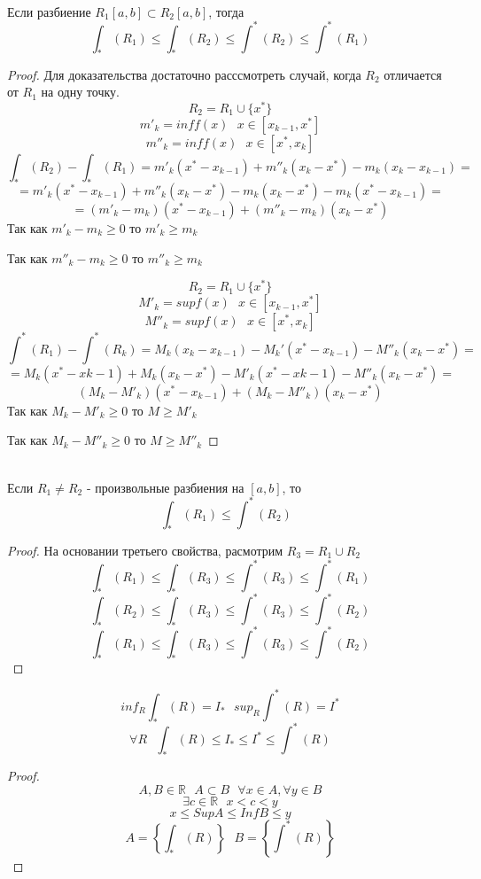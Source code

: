 \\
Если разбиение $R_1 [a,b] \subset R_2 [a,b]$, тогда
\[\int_* (R_1) \le \int_* (R_2) \le \int^* (R_2) \le \int^* (R_1)\]

\begin{proof}
  Для доказательства достаточно расссмотреть случай, когда $R_2$ отличается от
  $R_1$ на одну точку.
  \[R_2 = R_1 \cup \{x^*\}\]
  \[m'_k = inf f(x) ~~~ x \in [x_{k - 1}, x^*]\]
  \[m''_k = inf f(x) ~~~ x \in [x^*, x_k]\]
  \[
     \int_* (R_2) - \int_* (R_1) = m'_k (x^* - x_{k-1}) + m''_k (x_k - x^*) -
     m_k (x_k - x_{k - 1}) =
  \]
  \[
     = m'_k (x^* - x_{k - 1}) + m''_k (x_k - x^*) - m_k (x_k - x^*) -
     m_k (x^* - x_{k - 1}) =
  \]
  \[
     = (m'_k - m_k)(x^* - x_{k - 1}) + (m''_k - m_k)
     (x_k - x^*)
  \]
  Так как $m'_k - m_k \ge 0$ то $m'_k \ge m_k$

  Так как $m''_k - m_k \ge 0$ то $m''_k \ge m_k$

  $$
  R_2 = R_1 \cup \{x^*\}
  $$
  $$
  M'_k = sup f(x) ~~~ x \in [x_{k-1}, x^*]
  $$
  $$
  M''_k = sup f(x) ~~~ x \in [x^*, x_k]
  $$
  $$
  \int^* (R_1) - \int^*(R_k) = M_k(x_k - x_{k-1}) - M_k'(x^* - x_{k-1})
  - M''_k(x_k - x^*) =
  $$
  $$
  = M_k(x^* - x{k-1}) + M_k(x_k - x^*) - M'_k(x^* - x{k-1}) - M''_k(x_k - x^*) =
  $$
  $$
  (M_k - M'_k)(x^* - x_{k-1}) + (M_k - M''_k)(x_k - x^*)
  $$
  Так как $M_k - M'_k \ge 0$ то $M \ge M'_k$

  Так как $M_k - M''_k \ge 0$ то $M \ge M''_k$
\end{proof}

\\
Если $R_1 \not= R_2$ - произвольные разбиения на $[a,b]$, то
\[\int_* (R_1) \le \int^* (R_2) ~~~ \]

\begin{proof}
  На основании третьего свойства, расмотрим $R_3 = R_1 \cup R_2$
  \[\int_* (R_1) \le \int_* (R_3) \le \int^* (R_3) \le \int^* (R_1)\]
  \[\int_* (R_2) \le \int_* (R_3) \le \int^* (R_3) \le \int^* (R_2)\]
  \[\int_* (R_1) \le \int_* (R_3) \le \int^* (R_3) \le \int^* (R_2)\]
\end{proof}

$$
inf_R \int_* (R) = I_* ~~~ sup_R \int^* (R) = I^*
$$
\[\forall R ~~~ \int_* (R) \le I_* \le I^* \le \int^* (R)\]

\begin{proof}
  \[
  A, B \in \mathbb R ~~~ A \subset B ~~~ \forall x \in A, \forall y \in B
  \]
  \[\exists c \in \mathbb R ~~~ x < c < y\]
  \[x \le Sup A \le Inf B \le y\]
  \[A = \left\{ \int_* (R) \right\} ~~~ B = \left\{ \int^* (R) \right\}\]
\end{proof}

